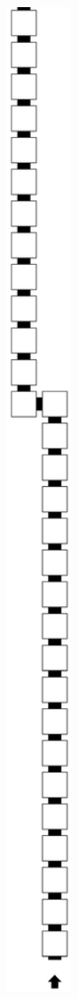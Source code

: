 \begin{itemize}
        \begin{figure}[H]\ContinuedFloat
            \centering
            \begin{subfigure}[t]{0.33\textwidth}
                \centering
                \includegraphics[width=0.33\textwidth]{warping_pre_warp_case1_digit1_msr}

\end{subfigure}
\end{figure}
\end{itemize}
